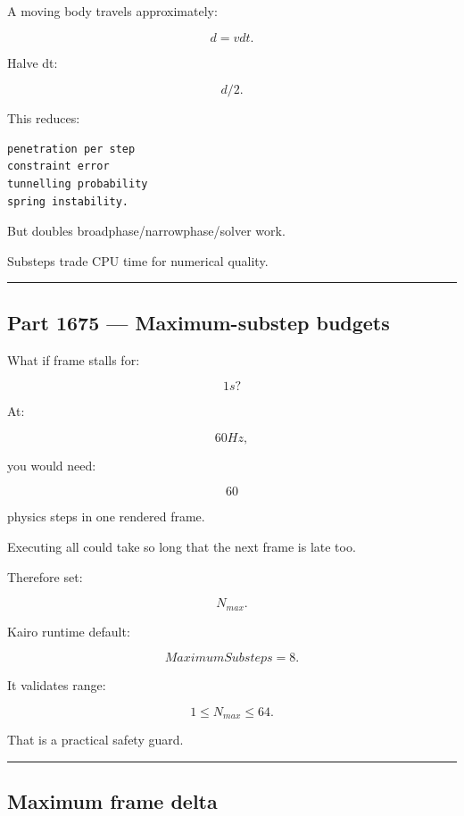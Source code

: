 \hypertarget{06-engine-ii-ch037-why-substeps-improve-collision-and-constraints}{}

A moving body travels approximately:

\[
d=vdt.
\]

Halve dt:

\[
d/2.
\]

This reduces:

\begin{verbatim}
penetration per step
constraint error
tunnelling probability
spring instability.
\end{verbatim}

But doubles broadphase/narrowphase/solver work.

Substeps trade CPU time for numerical quality.

\begin{center}\rule{0.5\linewidth}{0.5pt}\end{center}

\subsection{Part 1675 --- Maximum-substep budgets}\label{06-engine-ii-ch037-part-1675-maximum-substep-budgets}

\hypertarget{06-engine-ii-ch037-part-1675-maximum-substep-budgets}{}

What if frame stalls for:

\[
1s?
\]

At:

\[
60Hz,
\]

you would need:

\[
60
\]

physics steps in one rendered frame.

Executing all could take so long that the next frame is late too.

Therefore set:

\[
N_{max}.
\]

Kairo runtime default:

\[
\boxed{
MaximumSubsteps=8.
}
\]

It validates range:

\[
1\le N_{max}\le64.
\]

That is a practical safety guard.

\begin{center}\rule{0.5\linewidth}{0.5pt}\end{center}

\subsection{Maximum frame delta}\label{06-engine-ii-ch037-maximum-frame-delta}

